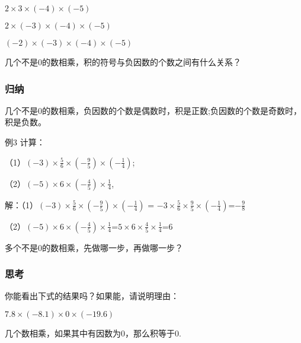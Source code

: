 \documentclass{article}
\begin{document}
\begin{article}
$2\times3\times(-4)\times(-5)$

$2\times(-3)\times(-4)\times(-5)$

$(-2)\times(-3)\times(-4)\times(-5)$

几个不是0的数相乘，积的符号与负因数的个数之间有什么关系？

\subsubsection{归纳}

几个不是0的数相乘，负因数的个数是偶数时，积是正数;负因数的个数是奇数时，积是负数。

\begin{example}

例3 计算：

（1）$(-3)\times\frac{5}{6}\times(-\frac{9}{5})\times(-\frac{1}{4})$;

（2）$(-5)\times6\times(-\frac{4}{5})\times\frac{1}{4}$,

解：（1）$(-3)\times\frac{5}{6}\times(-\frac{9}{5})\times(-\frac{1}{4})$ = 
$-3\times\frac{5}{6}\times\frac{9}{5}\times(-\frac{1}{4})$=$-\frac{9}{8}$

（2）$(-5)\times6\times(-\frac{4}{5})\times\frac{1}{4}$=$5\times6\times\frac{4}{5}\times\frac{1}{4}$=6

多个不是0的数相乘，先做哪一步，再做哪一步？

\end{example}

\subsubsection{思考}

你能看出下式的结果吗？如果能，请说明理由：

$7.8\times(-8.1)\times0\times(-19.6)$

几个数相乘，如果其中有因数为0，那么积等于0.

\end{article}
\end{document}
